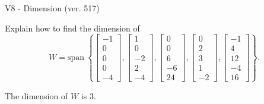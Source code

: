 \begin{exercise}
  \begin{exerciseTitle}V8 - Dimension (ver. 517)\end{exerciseTitle}
  \begin{exerciseStatement}
    Explain how to find the dimension of 
\[W=\mathrm{span}\ \left\{\left[\begin{array}{r}
-1 \\
0 \\
0 \\
0 \\
-4
\end{array}\right] , \left[\begin{array}{r}
1 \\
0 \\
-2 \\
2 \\
-4
\end{array}\right] , \left[\begin{array}{r}
0 \\
0 \\
6 \\
-6 \\
24
\end{array}\right] , \left[\begin{array}{r}
0 \\
2 \\
3 \\
1 \\
-2
\end{array}\right] , \left[\begin{array}{r}
-1 \\
4 \\
12 \\
-4 \\
16
\end{array}\right]\right\}.\]



  \end{exerciseStatement}
  \begin{exerciseAnswer}
   The dimension of \(W\) is  \(3\).
  


  \end{exerciseAnswer}
\end{exercise}